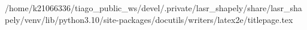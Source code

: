/home/k21066336/tiago_public_ws/devel/.private/lasr_shapely/share/lasr_shapely/venv/lib/python3.10/site-packages/docutils/writers/latex2e/titlepage.tex